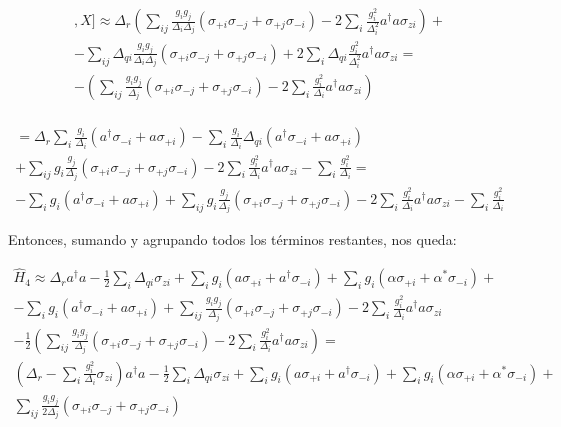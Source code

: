 \begin{multline}
[[H,X],X] \approx \Delta_r \left(\sum\limits_{ij} \frac{g_i g_j}{\Delta_i \Delta_j} \left(\sigma_{+i} \sigma_{-j} + \sigma_{+j} \sigma_{-i}\right) -
2 \sum\limits_{i} \frac{g_i^2}{\Delta_i^2} a^\dagger a \sigma_{zi} \right) + \\
- \sum\limits_{ij} \Delta_{qi}  \frac{g_i g_j}{\Delta_i \Delta_j} \left(\sigma_{+i} \sigma_{-j} + \sigma_{+j} \sigma_{-i}\right) +
2 \sum\limits_{i} \Delta_{qi} \frac{g_i^2}{\Delta_i^2} a^\dagger a \sigma_{zi} = \\
- \left(\sum\limits_{ij} \frac{g_i g_j}{\Delta_j} \left(\sigma_{+i} \sigma_{-j} + \sigma_{+j} \sigma_{-i}\right) -
2 \sum\limits_{i} \frac{g_i^2}{\Delta_i} a^\dagger a \sigma_{zi} \right) \\
\end{multline}

\begin{multline}
    [H,X] = \Delta_r \sum\limits_i \frac{g_i} {\Delta_i} (a^\dagger \sigma_{-i} + a \sigma_{+i}) - \sum\limits_i \frac{g_i} {\Delta_i} \Delta_{qi} (a^\dagger \sigma_{-i} + a \sigma_{+i}) \\
+ \sum\limits_{ij} g_i \frac{g_j}{\Delta_j} \left(\sigma_{+i} \sigma_{-j} + \sigma_{+j} \sigma_{-i}\right) - 2 \sum\limits_{i} \frac{g_i^2}{\Delta_i} a^\dagger a \sigma_{zi} - \sum\limits_i \frac{g_i^2} {\Delta_i} = \\
- \sum\limits_i g_i (a^\dagger \sigma_{-i} + a \sigma_{+i}) + \sum\limits_{ij} g_i \frac{g_j}{\Delta_j} \left(\sigma_{+i} \sigma_{-j} + \sigma_{+j} \sigma_{-i}\right) - 2 \sum\limits_{i} \frac{g_i^2}{\Delta_i} a^\dagger a \sigma_{zi} - \sum\limits_i \frac{g_i^2} {\Delta_i}
\end{multline}

Entonces, sumando y agrupando todos los términos restantes, nos queda:

\begin{multline}
\hat{H}_4 \approx \Delta_r a^\dagger a - \frac{1}{2} \sum\limits_i \Delta_{qi} \sigma_{zi} + \sum\limits_i g_i (a \sigma_{+i} + a^\dagger \sigma_{-i}) + \sum\limits_i g_i (\alpha \sigma_{+i} + \alpha^* \sigma_{-i}) + \\
- \sum\limits_i g_i (a^\dagger \sigma_{-i} + a \sigma_{+i}) + \sum\limits_{ij} \frac{g_i g_j}{\Delta_j} \left(\sigma_{+i} \sigma_{-j} + \sigma_{+j} \sigma_{-i}\right) - 2 \sum\limits_{i} \frac{g_i^2}{\Delta_i} a^\dagger a \sigma_{zi} \\
- \frac{1}{2} \left(\sum\limits_{ij} \frac{g_i g_j}{\Delta_j} \left(\sigma_{+i} \sigma_{-j} + \sigma_{+j} \sigma_{-i}\right) -
2 \sum\limits_{i} \frac{g_i^2}{\Delta_i} a^\dagger a \sigma_{zi} \right) = \\
(\Delta_r - \sum\limits_{i} \frac{g_i^2}{\Delta_i} \sigma_{zi}) a^\dagger a - \frac{1}{2} \sum\limits_i \Delta_{qi} \sigma_{zi} + \sum\limits_i g_i (a \sigma_{+i} + a^\dagger \sigma_{-i}) + \sum\limits_i g_i (\alpha \sigma_{+i} + \alpha^* \sigma_{-i}) + \\
\sum\limits_{ij} \frac{g_i g_j}{2 \Delta_j} \left(\sigma_{+i} \sigma_{-j} + \sigma_{+j} \sigma_{-i}\right)
\end{multline}

